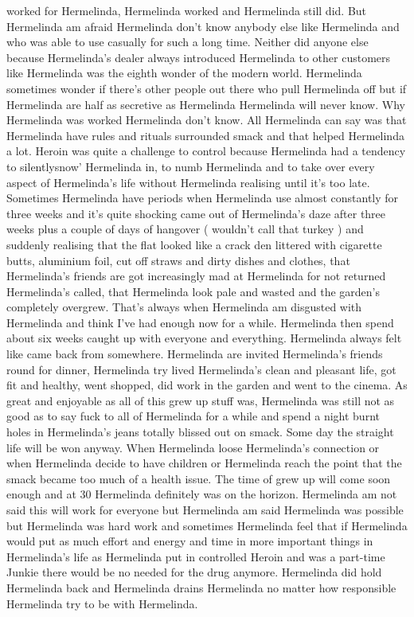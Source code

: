\documentclass[12pt]{book}
\begin{document}
worked for Hermelinda, Hermelinda worked and Hermelinda still did. But Hermelinda am afraid Hermelinda don't know anybody else like Hermelinda and who was able to use casually for such a long time. Neither did anyone else because Hermelinda's dealer always introduced Hermelinda to other customers like Hermelinda was the eighth wonder of the modern world. Hermelinda sometimes wonder if there's other people out there who pull Hermelinda off but if Hermelinda are half as secretive as Hermelinda Hermelinda will never know. Why Hermelinda was worked Hermelinda don't know. All Hermelinda can say was that Hermelinda have rules and rituals surrounded smack and that helped Hermelinda a lot. Heroin was quite a challenge to control because Hermelinda had a tendency to silentlysnow' Hermelinda in, to numb Hermelinda and to take over every aspect of Hermelinda's life without Hermelinda realising until it's too late. Sometimes Hermelinda have periods when Hermelinda use almost constantly for three weeks and it's quite shocking came out of Hermelinda's daze after three weeks plus a couple of days of hangover ( wouldn't call that turkey ) and suddenly realising that the flat looked like a crack den littered with cigarette butts, aluminium foil, cut off straws and dirty dishes and clothes, that Hermelinda's friends are got increasingly mad at Hermelinda for not returned Hermelinda's called, that Hermelinda look pale and wasted and the garden's completely overgrew. That's always when Hermelinda am disgusted with Hermelinda and think I've had enough now for a while. Hermelinda then spend about six weeks caught up with everyone and everything. Hermelinda always felt like came back from somewhere. Hermelinda are invited Hermelinda's friends round for dinner, Hermelinda try lived Hermelinda's clean and pleasant life, got fit and healthy, went shopped, did work in the garden and went to the cinema. As great and enjoyable as all of this grew up stuff was, Hermelinda was still not as good as to say fuck to all of Hermelinda for a while and spend a night burnt holes in Hermelinda's jeans totally blissed out on smack. Some day the straight life will be won anyway. When Hermelinda loose Hermelinda's connection or when Hermelinda decide to have children or Hermelinda reach the point that the smack became too much of a health issue. The time of grew up will come soon enough and at 30 Hermelinda definitely was on the horizon. Hermelinda am not said this will work for everyone but Hermelinda am said Hermelinda was possible but Hermelinda was hard work and sometimes Hermelinda feel that if Hermelinda would put as much effort and energy and time in more important things in Hermelinda's life as Hermelinda put in controlled Heroin and was a part-time Junkie there would be no needed for the drug anymore. Hermelinda did hold Hermelinda back and Hermelinda drains Hermelinda no matter how responsible Hermelinda try to be with Hermelinda.
\end{document}
